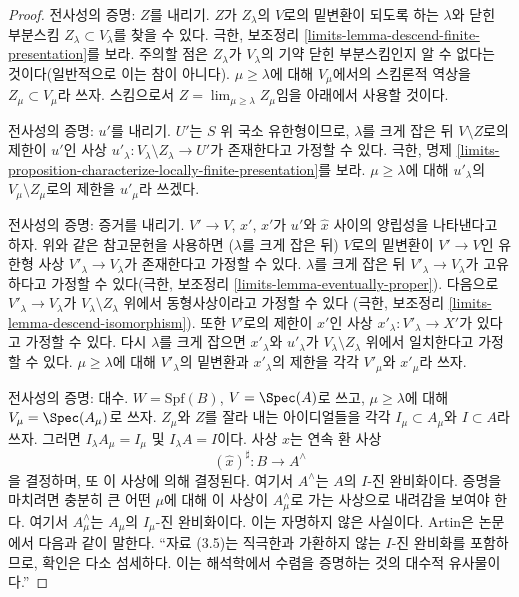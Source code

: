 \begin{proof}
\medskip\noindent
전사성의 증명: $Z$를 내리기. $Z$가 $Z_\lambda$의 $V$로의
밑변환이 되도록 하는 $\lambda$와 닫힌 부분스킴
$Z_\lambda \subset V_\lambda$를 찾을 수 있다.
극한, 보조정리 \ref{limits-lemma-descend-finite-presentation}를 보라.
주의할 점은 $Z_\lambda$가 $V_\lambda$의 기약 닫힌 부분스킴인지
알 수 없다는 것이다(일반적으로 이는 참이 아니다).
$\mu \geq \lambda$에 대해 $V_\mu$에서의 스킴론적 역상을
$Z_\mu \subset V_\mu$라 쓰자. 스킴으로서
$Z = \lim_{\mu \geq \lambda} Z_\mu$임을 아래에서 사용할 것이다.

\medskip\noindent
전사성의 증명: $u'$를 내리기.
$U'$는 $S$ 위 국소 유한형이므로, $\lambda$를 크게 잡은 뒤
$V \setminus Z$로의 제한이 $u'$인 사상
$u'_\lambda : V_\lambda \setminus Z_\lambda \to U'$가
존재한다고 가정할 수 있다. 극한, 명제
\ref{limits-proposition-characterize-locally-finite-presentation}를 보라.
$\mu \geq \lambda$에 대해 $u'_\lambda$의
$V_\mu \setminus Z_\mu$로의 제한을 $u'_\mu$라 쓰겠다.

\medskip\noindent
전사성의 증명: 증거를 내리기.
$V' \to V$, $\hat x'$, $x'$가 $u'$와 $\hat x$ 사이의 양립성을
나타낸다고 하자. 위와 같은 참고문헌을 사용하면 ($\lambda$를 크게 잡은 뒤)
$V$로의 밑변환이 $V' \to V$인 유한형 사상
$V'_\lambda \to V_\lambda$가 존재한다고 가정할 수 있다.
$\lambda$를 크게 잡은 뒤 $V'_\lambda \to V_\lambda$가 고유하다고
가정할 수 있다(극한, 보조정리 \ref{limits-lemma-eventually-proper}).
다음으로 $V'_\lambda \to V_\lambda$가
$V_\lambda \setminus Z_\lambda$ 위에서 동형사상이라고 가정할 수 있다
(극한, 보조정리 \ref{limits-lemma-descend-isomorphism}).
또한 $V'$로의 제한이 $x'$인 사상
$x'_\lambda : V'_\lambda \to X'$가 있다고 가정할 수 있다.
다시 $\lambda$를 크게 잡으면 $x'_\lambda$와 $u'_\lambda$가
$V_\lambda \setminus Z_\lambda$ 위에서 일치한다고 가정할 수 있다.
$\mu \geq \lambda$에 대해 $V'_\lambda$의 밑변환과
$x'_\lambda$의 제한을 각각 $V'_\mu$와 $x'_\mu$라 쓰자.

\medskip\noindent
전사성의 증명: 대수.
$W = \text{Spf}(B)$, $V = \Spec(A)$로 쓰고,
$\mu \geq \lambda$에 대해 $V_\mu = \Spec(A_\mu)$로 쓰자.
$Z_\mu$와 $Z$를 잘라 내는 아이디얼들을 각각
$I_\mu \subset A_\mu$와 $I \subset A$라 쓰자.
그러면 $I_\lambda A_\mu = I_\mu$ 및 $I_\lambda A = I$이다.
사상 $\hat x$는 연속 환 사상
$$
(\hat x)^\sharp : B \longrightarrow A^\wedge
$$
을 결정하며, 또 이 사상에 의해 결정된다. 여기서 $A^\wedge$는
$A$의 $I$-진 완비화이다. 증명을 마치려면 충분히 큰 어떤 $\mu$에 대해
이 사상이 $A_\mu^\wedge$로 가는 사상으로 내려감을 보여야 한다.
여기서 $A_\mu^\wedge$는 $A_\mu$의 $I_\mu$-진 완비화이다.
이는 자명하지 않은 사실이다. Artin은 논문 \cite{ArtinII}에서 다음과 같이
말한다. “자료 (3.5)는 직극한과 가환하지 않는 $I$-진 완비화를 포함하므로,
확인은 다소 섬세하다. 이는 해석학에서 수렴을 증명하는 것의 대수적 유사물이다.”


\end{proof}

